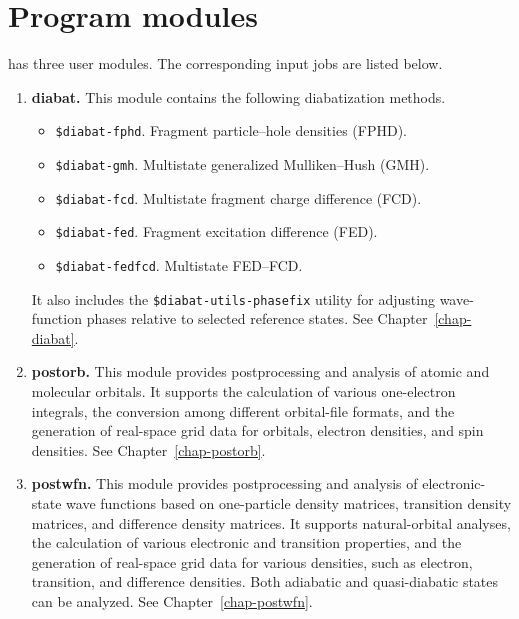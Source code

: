 \section{Program modules}
\progname{} has three user modules. The corresponding input jobs are listed below.
\begin{enumerate}
\item \textbf{diabat.} This module contains the following diabatization methods.
  \begin{itemize}
  \item \texttt{\$diabat-fphd}. Fragment particle--hole densities (FPHD).
  \item \texttt{\$diabat-gmh}. Multistate generalized Mulliken--Hush (GMH).
  \item \texttt{\$diabat-fcd}. Multistate fragment charge difference (FCD).
  \item \texttt{\$diabat-fed}. Fragment excitation difference (FED).
  \item \texttt{\$diabat-fedfcd}. Multistate FED--FCD.
  \end{itemize}
It also includes the \texttt{\$diabat-utils-phasefix} utility for adjusting wave-function phases relative to selected reference states. See Chapter~\ref{chap-diabat}.

\item \textbf{postorb.}
This module provides postprocessing and analysis of atomic and molecular orbitals.
It supports the calculation of various one-electron integrals, the conversion among different orbital-file formats, and the generation of real-space grid data for orbitals, electron densities, and spin densities.
See Chapter~\ref{chap-postorb}.

\item \textbf{postwfn.}
This module provides postprocessing and analysis of electronic-state wave functions based on one-particle density matrices, transition density matrices, and difference density matrices.
It supports natural-orbital analyses, the calculation of various electronic and transition properties, and the generation of real-space grid data for various densities, such as electron, transition, and difference densities.
Both adiabatic and quasi-diabatic states can be analyzed.
See Chapter~\ref{chap-postwfn}.

\end{enumerate}
